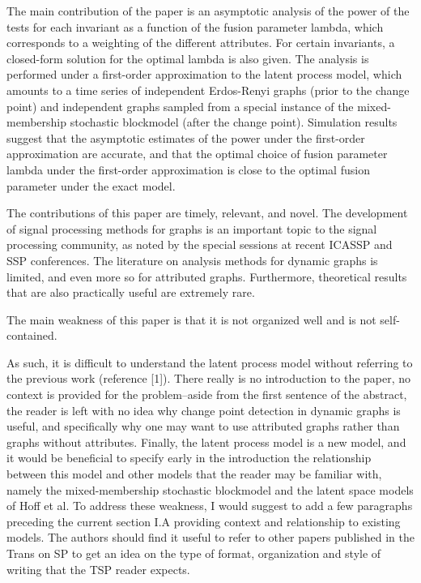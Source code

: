 The main contribution of the paper is an asymptotic analysis of the
power of the tests for each invariant as a function of the fusion
parameter lambda, which corresponds to a weighting of the different
attributes. For certain invariants, a closed-form solution for the
optimal lambda is also given. The analysis is performed under a
first-order approximation to the latent process model, which amounts
to a time series of independent Erdos-Renyi graphs (prior to the
change point) and independent graphs sampled from a special instance
of the mixed-membership stochastic blockmodel (after the change
point). Simulation results suggest that the asymptotic estimates of
the power under the first-order approximation are accurate, and that
the optimal choice of fusion parameter lambda under the first-order
approximation is close to the optimal fusion parameter under the exact
model.

The contributions of this paper are timely, relevant, and novel. The
development of signal processing methods for graphs is an important
topic to the signal processing community, as noted by the special
sessions at recent ICASSP and SSP conferences. The literature on
analysis methods for dynamic graphs is limited, and even more so for
attributed graphs. Furthermore, theoretical results that are also
practically useful are extremely rare.

The main weakness of this paper is that it is not organized well and
is not self-contained.

As such, it is difficult to understand the latent process model
without referring to the previous work (reference [1]). There really
is no introduction to the paper, no context is provided for the
problem--aside from the first sentence of the abstract, the reader is
left with no idea why change point detection in dynamic graphs is
useful, and specifically why one may want to use attributed graphs
rather than graphs without attributes. Finally, the latent process
model is a new model, and it would be beneficial to specify early in
the introduction the relationship between this model and other models
that the reader may be familiar with, namely the mixed-membership
stochastic blockmodel and the latent space models of Hoff et al. To
address these weakness, I would suggest to add a few paragraphs
preceding the current section I.A providing context and relationship
to existing models. The authors should find it useful to refer to
other papers published in the Trans on SP to get an idea on the type
of format, organization and style of writing that the TSP reader
expects.


